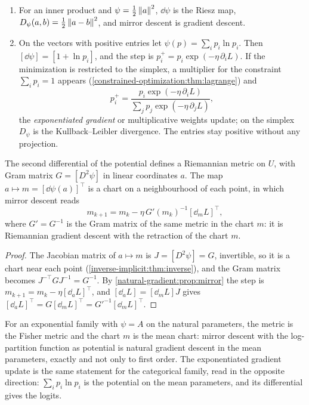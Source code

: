 \begin{notechapter}
\begin{example}\label{natural-gradient:ex:mirror}
\begin{enumerate}[nosep]
  \item For an inner product and $\psi = \frac12\left\|a\right\|^2$, $\dd\psi$ is
        the Riesz map, $D_\psi(a, b) = \frac12\left\|a - b\right\|^2$, and mirror
        descent is gradient descent.
  \item On the vectors with positive entries let
        $\psi(p) = \sum_ip_i\ln p_i$. Then
        $[\dd\psi] = [1 + \ln p_i]$, and the step is
        $p_i^+ = p_i\exp(-\eta\,\partial_iL)$. If the minimization is
        restricted to the simplex, a multiplier for the constraint
        $\sum_ip_i = 1$ appears
        (\cref{constrained-optimization:thm:lagrange}) and
        \[
          p_i^+ = \frac{p_i\exp(-\eta\,\partial_iL)}
                       {\sum_jp_j\exp(-\eta\,\partial_jL)} ,
        \]
        the \emph{exponentiated gradient} or multiplicative weights
        update; on the simplex $D_\psi$ is the Kullback--Leibler
        divergence. The entries stay positive without any projection.
\end{enumerate}
\end{example}

\begin{theorem}
\label{natural-gradient:thm:mirror}
The second differential of the potential defines a Riemannian metric on
$U$, with Gram matrix $G = [D^2\psi]$ in linear coordinates $a$. The map
$a\mapsto m = [\dd\psi(a)]^\top$ is a chart on a neighbourhood of each
point, in which mirror descent reads
\[
  m_{k+1} = m_k - \eta\,G'(m_k)^{-1}[\dd_mL]^\top ,
\]
where $G' = G^{-1}$ is the Gram matrix of the same metric in the chart
$m$: it is Riemannian gradient descent with the retraction of the chart
$m$.
\end{theorem}

\begin{proof}
The Jacobian matrix of $a\mapsto m$ is $J = [D^2\psi] = G$, invertible,
so it is a chart near each point
(\cref{inverse-implicit:thm:inverse}), and the Gram matrix becomes
$J^{-\top}GJ^{-1} = G^{-1}$. By \cref{natural-gradient:prop:mirror} the
step is $m_{k+1} = m_k - \eta[\dd_aL]^\top$, and
$[\dd_aL] = [\dd_mL]J$ gives $[\dd_aL]^\top = G[\dd_mL]^\top
= G'^{-1}[\dd_mL]^\top$.
\end{proof}

For an exponential family with $\psi = A$ on the natural parameters, the
metric is the Fisher metric and the chart $m$ is the mean chart: mirror
descent with the log-partition function as potential is natural gradient
descent in the mean parameters, exactly and not only to first order. The
exponentiated gradient update is the same statement for the categorical
family, read in the opposite direction: $\sum_ip_i\ln p_i$ is the
potential on the mean parameters, and its differential gives the logits.


\end{notechapter}
